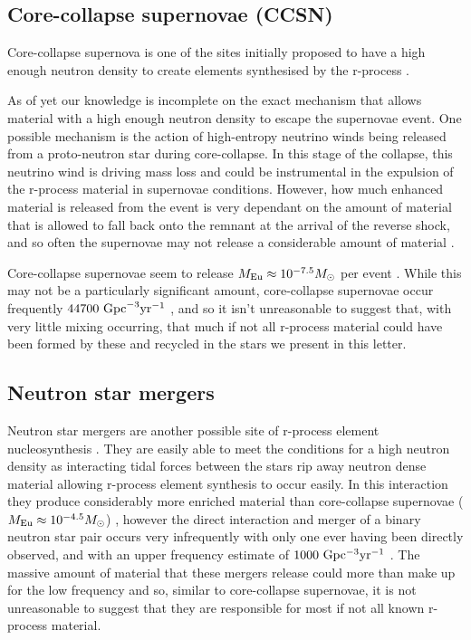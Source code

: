 \documentclass[a4paper,fleqn,usenatbib]{mnras}
\begin{document}
	\subsection{Core-collapse supernovae (CCSN)}
	Core-collapse supernova is one of the sites initially proposed to have a high enough neutron density to create elements synthesised by the r-process \citep{Burbidge1957}. 
	
	As of yet our knowledge is incomplete on the exact mechanism that allows material with a high enough neutron density to escape the supernovae event.
	One possible mechanism is the action of high-entropy neutrino winds being released from a proto-neutron star during core-collapse. In this stage of the collapse, this neutrino wind is driving mass loss and could be instrumental in the expulsion of the r-process material in supernovae conditions. However, how much enhanced material is released from the event is very dependant on the amount of material that is allowed to fall back onto the remnant at the arrival of the reverse shock, and so often the supernovae may not release a considerable amount of material \citep{Woosley1992, Burrows1995}. 
	
	Core-collapse supernovae seem to release $M_{\rm{Eu}}\approx10^{-7.5} M_{\odot}$ per event \citep{Argast2004} . While this may not be a particularly significant amount, core-collapse supernovae occur frequently $44700\ \rm{Gpc}^{-3} \rm{yr^{-1}}$ \citep{Li2011}, and so it isn't unreasonable to suggest that, with very little mixing occurring, that much if not all r-process material could have been formed by these and recycled in the stars we present in this letter.
	
	\subsection{Neutron star mergers}
	\label{NSmerg}
	Neutron star mergers are another possible site of r-process element nucleosynthesis \citep{Kasen2017,Hotok2013,Drout2017}. They are easily able to meet the conditions for a high neutron density as interacting tidal forces between the stars rip away neutron dense material allowing r-process element synthesis to occur easily. In this interaction they produce considerably more enriched material than core-collapse supernovae ($M_{\rm{Eu}}\approx10^{-4.5} M_{\odot}$) \citep{Goriely2011}, however the direct interaction and merger of a binary neutron star pair occurs very infrequently with only one ever having been directly observed, and with an upper frequency estimate of $1000\ \rm{Gpc^{-3}yr^{-1}}$ \citep{LIGO2016}. The massive amount of material that these mergers release could more than make up for the low frequency and so, similar to core-collapse supernovae, it is not unreasonable to suggest that they are responsible for most if not all known r-process material. 
\end{document}
